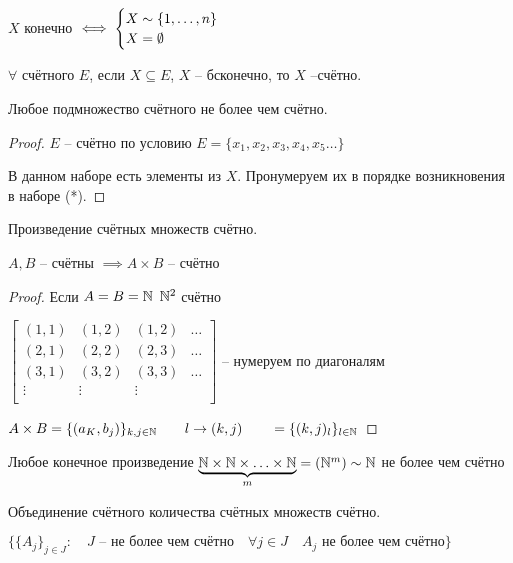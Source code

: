     \begin{note}
        $X$ конечно $\iff \begin{cases}
            X\sim \{1, \ldots, n\}\\
            X = \emptyset \\
        \end{cases}$

    \end{note}
    \begin{theorem}
        $\forall $ счётного $E$, если $X\subseteq E$, $X$ -- бсконечно, то $X$ --счётно.
    \end{theorem}
    \begin{note}
        Любое подмножество счётного не более чем счётно.
    \end{note}
    \begin{proof}
        $E$ -- счётно по условию $E = \{x_1, x_2, x_3, x_4, x_5 \ldots\}$

        В данном наборе есть элементы  из $X$. Пронумеруем их в порядке возникновения в наборе (*).
    \end{proof}
    \begin{theorem}
        Произведение счётных множеств счётно.

        $A,B$ -- счётны $\implies A\times B$ -- счётно
    \end{theorem}
    \begin{proof}
        Если $A = B = \mathbb{N} $ $\mathbb{N} ^2$ счётно

        $\begin{bmatrix} (1,1)&(1,2)&(1,2)&\ldots\\ (2,1)&(2,2)&(2,3)&\ldots\\ (3,1)&(3,2)&(3,3)&\ldots\\ \vdots& \vdots& \vdots& \\\end{bmatrix} $ -- нумеруем по диагоналям

        $A\times B = \{(a_K, b_j)\}_{k,j\in \mathbb{N} }\qquad l\to (k,j)\qquad =\{(k,j)_l\}_{l\in \mathbb{N} }$
    \end{proof}
    \begin{note}
        Любое конечное произведение $\underbrace{\mathbb{N} \times \mathbb{N} \times \ldots\times \mathbb{N} }_{m} = (\mathbb{N} ^m) \sim  \mathbb{N} $ не более чем счётно

    \end{note}
    \begin{theorem}
        Объединение счётного количества счётных множеств счётно.
    \end{theorem}
        $\{\{A_j\}_{j\in J}:\quad J \text{ -- не более чем счётно} \quad \forall j\in J\quad A_j \text{ не более чем счётно}\}$

